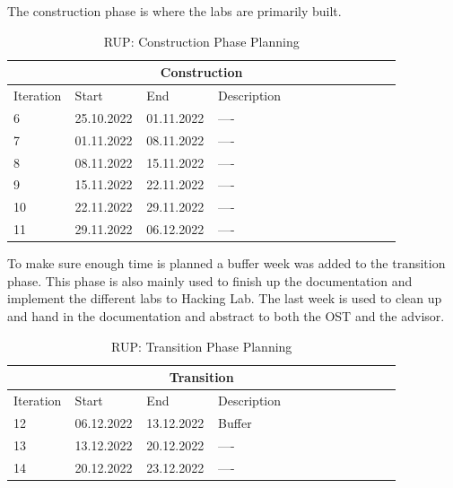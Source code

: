\noindent The construction phase is where the labs are primarily built. 
\begin{table}[H]
    \centering
    \begin{tabular}{|p{0.1\linewidth}|p{0.15\linewidth}|p{0.15\linewidth}|p{0.46\linewidth}|}
        \hline
        \multicolumn{4}{||c||}{\textbf{Construction}} \\
        \hline \hline
        Iteration & Start & End & Description \\
        \hline \hline
        6 & 25.10.2022 & 01.11.2022 & ----\\
        \hline
        7 & 01.11.2022 & 08.11.2022 & ---- \\
        \hline
        8 & 08.11.2022 & 15.11.2022 & ---- \\
        \hline
        9 & 15.11.2022 & 22.11.2022 & ---- \\
        \hline
        10 & 22.11.2022 & 29.11.2022 & ---- \\
        \hline
        11 & 29.11.2022 & 06.12.2022 & ---- \\
        \hline
    \end{tabular}
    \caption{RUP: Construction Phase Planning}
    \label{construction_table}
\end{table}

\noindent To make sure enough time is planned a buffer week was added to the transition phase. This phase is also mainly used to finish up the documentation and implement the different labs to Hacking Lab. The last week is used to clean up and hand in the documentation and abstract to both the OST and the advisor.
\begin{table}[H]
    \centering
    \begin{tabular}{|p{0.1\linewidth}|p{0.15\linewidth}|p{0.15\linewidth}|p{0.46\linewidth}|}
        \hline
        \multicolumn{4}{||c||}{\textbf{Transition}} \\
        \hline \hline
        Iteration & Start & End & Description \\
        \hline \hline
        12 & 06.12.2022 & 13.12.2022 & Buffer \\
        \hline
        13 & 13.12.2022 & 20.12.2022 & ---- \\
        \hline
        14 & 20.12.2022 & 23.12.2022 & ---- \\
        \hline
    \end{tabular}
    \caption{RUP: Transition Phase Planning}
    \label{transition_table}
\end{table}

